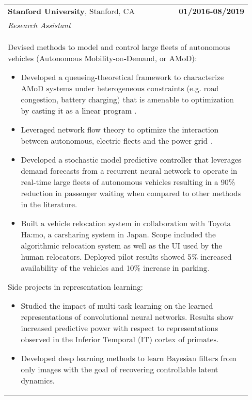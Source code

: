 \documentclass[a4paper,10pt]{article}
\begin{document}
\begin{tabularx}{\textwidth}{Xr}
 {\bf{Stanford University}}, Stanford, CA & \bf{01/2016-08/2019}\\
 \emph{Research Assistant} &\\
 \multicolumn{2}{p{0.98\textwidth}}{
 Devised methods to model and control large fleets of autonomous vehicles (Autonomous Mobility-on-Demand, or AMoD):
 \begin{itemize}
 	\item Developed a queueing-theoretical framework to characterize AMoD systems under heterogeneous constraints (e.g. road congestion, battery charging) that is amenable to optimization by casting it as a linear program \cite{IglesiasRossiEtAl2016,IglesiasRossiEtAl2017}.
 	\item Leveraged network flow theory to optimize the interaction between autonomous, electric fleets and the power grid \cite{RossiIglesiasEtAl2018,RossiIglesiasEtAl2018b}.
 	\item Developed a stochastic model predictive controller that leverages demand forecasts from a recurrent neural network to operate in real-time large fleets of autonomous vehicles \cite{IglesiasRossiEtAl2018,TsaoIglesiasEtAl} resulting in a 90\% reduction in passenger waiting when compared to other methods in the literature.
 	\item Built a vehicle relocation system in collaboration with Toyota Ha:mo, a carsharing system in Japan. Scope included the algorithmic relocation system as well as the UI used by the human relocators. Deployed pilot results showed 5\% increased availability of the vehicles and 10\% increase in parking.
 \end{itemize}
 Side projects in representation learning:
 \begin{itemize}
 	\item Studied the impact of multi-task learning on the learned representations of convolutional neural networks. Results show increased predictive power with respect to representations observed in the Inferior Temporal (IT) cortex of primates.
 	\item Developed deep learning methods to learn Bayesian filters from only images with the goal of recovering controllable latent dynamics. 
 \end{itemize}
 }\\


\end{tabularx}
\end{document}
